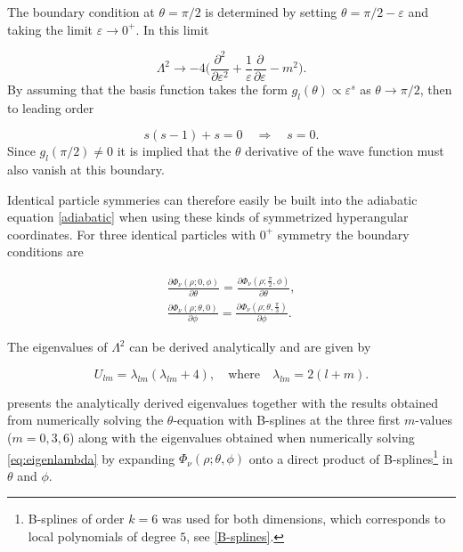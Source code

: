 The boundary condition at $\theta = \pi/2$ is determined by setting $\theta=\pi/2-\varepsilon$ and taking the limit $\varepsilon \rightarrow 0^+$. In this limit

\begin{equation}
\Lambda^{2} \rightarrow -4\Bigg(\frac{\partial^{2}}{\partial \varepsilon^{2}} + \frac{1}{\varepsilon} \frac{\partial}{\partial \varepsilon} - m^{2}\Bigg).
\end{equation}
By assuming that the basis function takes the form $g_l(\theta) \propto \varepsilon ^s$ as $\theta \rightarrow \pi/2$, then to leading order

\begin{equation}
s(s-1)+s = 0 \quad \Rightarrow \quad s=0.
\end{equation}
Since $g_l(\pi/2) \neq 0$ it is implied that the $\theta$ derivative of the wave function must also vanish at this boundary.

Identical particle symmeries can therefore easily be built into the adiabatic equation \eqref{adiabatic} when using these kinds of symmetrized hyperangular coordinates. For three identical particles with $0^+$ symmetry the boundary conditions are  

\begin{align}
\frac{\partial\Phi_{\nu}(\rho;0,\phi)}{\partial \theta} = \frac{\partial\Phi_{\nu}(\rho;\frac{\pi}{2},\phi)}{\partial \theta},\\
\frac{\partial\Phi_{\nu}(\rho;\theta,0)}{\partial \phi} = \frac{\partial\Phi_{\nu}(\rho;\theta,\frac{\pi}{3})}{\partial \phi}.
\end{align}

The eigenvalues of  $\Lambda^2$ can be derived analytically and are given by

\begin{equation}
U_{lm} = \lambda_{lm}(\lambda_{lm} + 4), \quad \text{where} \quad \lambda_{lm}=2(l+m).
\end{equation}

 presents the analytically derived eigenvalues together with the results obtained from numerically solving the $\theta$-equation with B-splines at the three first $m$-values ($m=0,3,6$) along with the eigenvalues obtained when numerically solving \eqref{eq:eigenlambda} by expanding $\Phi_{\nu}(\rho;\theta,\phi)$ onto a direct product of B-splines\footnote{B-splines of order $k=6$ was used for both dimensions, which corresponds to local polynomials of degree $5$, see \cref{B-splines}.} in $\theta$ and $\phi$. 

